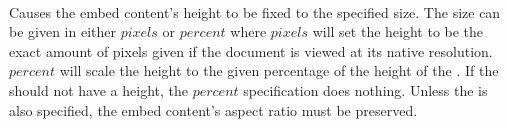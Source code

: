  \\

Causes the embed content's height to be fixed to the specified size. The size can be given in either \inline$pixels$ or \inline$percent$ where \inline$pixels$ will set the height to be the exact amount of pixels given if the document is viewed at its native resolution. \inline$percent$ will scale the height to the given percentage of the height of the . If the  should not have a height, the \inline$percent$ specification does nothing. Unless the  is also specified, the embed content's aspect ratio must be preserved. \\

\begin{examples}
\end{examples}

